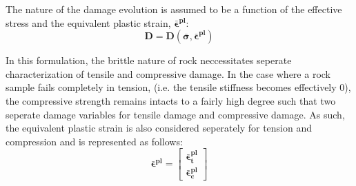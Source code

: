 The nature of the damage evolution is assumed to be a function of the effective stress and the equivalent plastic strain, $\boldsymbol{\bar{\epsilon}^{pl}}$:
\begin{equation}
\label{eqn:const8}
\mathbf{D} = \mathbf{D}(\boldsymbol{\bar{\sigma}}, \boldsymbol{\bar{\epsilon}^{pl}})
\end{equation}

In this formulation, the brittle nature of rock neccessitates seperate characterization of tensile and compressive damage. In the case where a rock sample fails completely in tension, (i.e. the tensile stiffness becomes effectively 0), the compressive strength remains intacts to a fairly high degree such that two seperate damage variables for tensile damage and compressive damage. As such, the equivalent plastic strain is also considered seperately for tension and compression and is represented as follows:
\begin{equation}
\label{eqn:const9}
\boldsymbol{\bar{\epsilon}^{pl}} = \begin{bmatrix} 
	\boldsymbol{\bar{\epsilon}_t^{pl}} \\ 
	\boldsymbol{\bar{\epsilon}_c^{pl}} \end{bmatrix}
\end{equation}